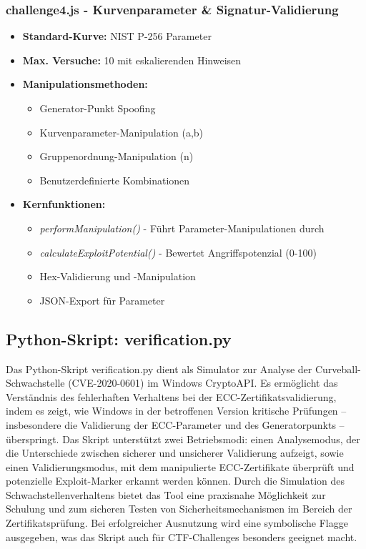 \documentclass{article}
\begin{document}
\subsubsection{challenge4.js - Kurvenparameter \& Signatur-Validierung}
\begin{itemize}
    \item \textbf{Standard-Kurve:} NIST P-256 Parameter
    \item \textbf{Max. Versuche:} 10 mit eskalierenden Hinweisen
    \item \textbf{Manipulationsmethoden:}
    \begin{itemize}
        \item Generator-Punkt Spoofing
        \item Kurvenparameter-Manipulation (a,b)
        \item Gruppenordnung-Manipulation (n)
        \item Benutzerdefinierte Kombinationen
    \end{itemize}
    \item \textbf{Kernfunktionen:}
    \begin{itemize}
        \item \emph{performManipulation()} - Führt Parameter-Manipulationen durch
        \item \emph{calculateExploitPotential()} - Bewertet Angriffspotenzial (0-100)
        \item Hex-Validierung und -Manipulation
        \item JSON-Export für Parameter
    \end{itemize}
\end{itemize}

\subsection{Python-Skript: verification.py}
Das Python-Skript verification.py dient als Simulator zur Analyse der Curveball-Schwachstelle (CVE-2020-0601) im Windows CryptoAPI. Es ermöglicht das Verständnis des fehlerhaften Verhaltens bei der ECC-Zertifikatsvalidierung, indem es zeigt, wie Windows in der betroffenen Version kritische Prüfungen – insbesondere die Validierung der ECC-Parameter und des Generatorpunkts – überspringt. Das Skript unterstützt zwei Betriebsmodi: einen Analysemodus, der die Unterschiede zwischen sicherer und unsicherer Validierung aufzeigt, sowie einen Validierungsmodus, mit dem manipulierte ECC-Zertifikate überprüft und potenzielle Exploit-Marker erkannt werden können. Durch die Simulation des Schwachstellenverhaltens bietet das Tool eine praxisnahe Möglichkeit zur Schulung und zum sicheren Testen von Sicherheitsmechanismen im Bereich der Zertifikatsprüfung. Bei erfolgreicher Ausnutzung wird eine symbolische Flagge ausgegeben, was das Skript auch für CTF-Challenges besonders geeignet macht.\\
\end{document}
